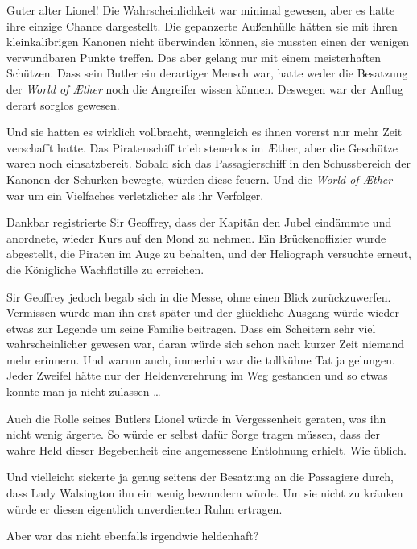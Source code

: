 Guter alter Lionel! Die Wahrscheinlichkeit war minimal gewesen,
aber es hatte ihre einzige Chance dargestellt. Die gepanzerte
Außenhülle hätten sie mit ihren kleinkalibrigen Kanonen nicht
überwinden können, sie mussten einen der wenigen verwundbaren
Punkte treffen. Das aber gelang nur mit einem meisterhaften
Schützen. Dass sein Butler ein derartiger Mensch war, hatte weder
die Besatzung der \textit{World of Æther} noch die Angreifer wissen können.
Deswegen war der Anflug derart sorglos gewesen.

Und sie hatten es wirklich vollbracht, wenngleich es ihnen vorerst
nur mehr Zeit verschafft hatte. Das Piratenschiff trieb steuerlos
im Æther, aber die Geschütze waren noch einsatzbereit. Sobald sich
das Passagierschiff in den Schussbereich der Kanonen der Schurken
bewegte, würden diese feuern. Und die \textit{World of Æther} war um ein
Vielfaches verletzlicher als ihr Verfolger.

\bigpar

Dankbar registrierte Sir Geoffrey, dass der Kapitän den Jubel
eindämmte und anordnete, wieder Kurs auf den Mond zu nehmen. Ein
Brückenoffizier wurde abgestellt, die Piraten im Auge zu behalten,
und der Heliograph versuchte erneut, die Königliche Wachflotille zu
erreichen.

\bigpar

Sir Geoffrey jedoch begab sich in die Messe, ohne einen Blick
zurückzuwerfen. Vermissen würde man ihn erst später und der
glückliche Ausgang würde wieder etwas zur Legende um seine Familie
beitragen. Dass ein Scheitern sehr viel wahrscheinlicher gewesen
war, daran würde sich schon nach kurzer Zeit niemand mehr erinnern.
Und warum auch, immerhin war die tollkühne Tat ja gelungen. Jeder
Zweifel hätte nur der Heldenverehrung im Weg gestanden und so etwas
konnte man ja nicht zulassen …

Auch die Rolle seines Butlers Lionel würde in Vergessenheit
geraten, was ihn nicht wenig ärgerte. So würde er selbst dafür
Sorge tragen müssen, dass der wahre Held dieser Begebenheit eine
angemessene Entlohnung erhielt. Wie üblich.

Und vielleicht sickerte ja genug seitens der Besatzung an die
Passagiere durch, dass Lady Walsington ihn ein wenig bewundern
würde. Um sie nicht zu kränken würde er diesen eigentlich
unverdienten Ruhm ertragen.

\bigpar

Aber war das nicht ebenfalls irgendwie heldenhaft?



